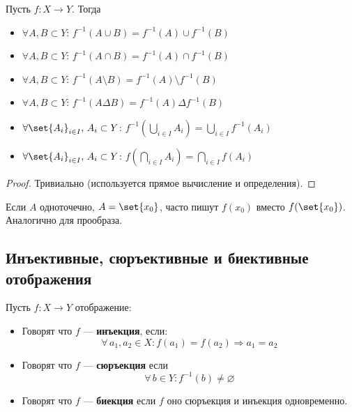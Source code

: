 \documentclass{article}
\begin{document}
\begin{proposition}
    Пусть \(f: X \rightarrow Y\). Тогда 
    \begin{itemize}
        \item \(\forall A, B \subset Y\): \(f^{-1}(A \cup B) = f^{-1}(A) \cup f^{-1}(B)\)
        \item \(\forall A, B \subset Y\): \(f^{-1}(A \cap B) = f^{-1}(A) \cap f^{-1}(B)\)
        \item \(\forall A, B \subset Y\): \(f^{-1}(A \setminus B) = f^{-1}(A) \setminus f^{-1}(B)\)
        \item \(\forall A, B \subset Y\): \(f^{-1}(A \Delta B) = f^{-1}(A) \Delta f^{-1}(B)\)
        \item \(\forall \set{A_i}_{i \in I},\, A_i \subset Y\):  \(f^{-1}(\bigcup_{i \in I} A_i) = \bigcup_{i \in I} f^{-1}(A_i)\)
        \item \(\forall \set{A_i}_{i \in  I},\, A_i \subset Y\):  \(f(\bigcap_{i \in I} A_i) = \bigcap_{i \in  I} f(A_i)\)
    \end{itemize}
\end{proposition}
\begin{proof}
    Тривиально (используется прямое вычисление и определения).
\end{proof}

\begin{remark}
    Если \(A\) одноточечно, \(A = \set{x_0}\), часто пишут \(f(x_0)\) вместо \(f(\set{x_0})\). Аналогично для прообраза.  
\end{remark}

\subsection{Инъективные, сюръективные и биективные отображения}
\begin{definition}
    \label{def:function-injection-surjection-bijection}
    Пусть \(f: X \rightarrow Y\) отображение:
    \begin{itemize}
        \item Говорят что \(f\) --- \textbf{инъекция}, если: 
        \[\forall\, a_1, a_2 \in X: f(a_1) = f(a_2) \Rightarrow a_1 = a_2\]
        \item Говорят что  \(f\) --- \textbf{сюръекция} если
        \[\forall\, b \in Y: f^{-1}(b) \neq \varnothing\]
        \item Говорят что  \(f\) --- \textbf{биекция} если \(f\) оно сюръекция и инъекция одновременно.
    \end{itemize}
\end{definition}
\end{document}
